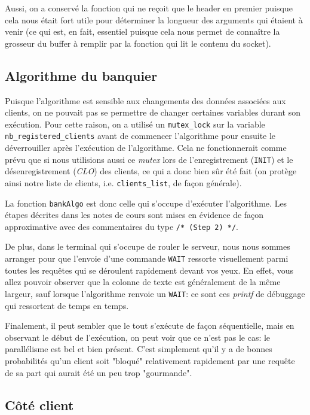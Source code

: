 \documentclass[11pt]{article}
\begin{document}
Aussi, on a conservé la fonction qui ne reçoit que le header en premier puisque cela nous était fort utile pour déterminer la longueur
des arguments qui étaient à venir (ce qui est, en fait, essentiel puisque cela nous permet de connaître la grosseur du buffer à remplir par la fonction qui lit le contenu du socket).


\subsection{Algorithme du banquier}

Puisque l'algorithme est sensible aux changements des données associées aux clients, on ne pouvait pas se permettre de changer certaines variables durant son exécution. Pour cette raison, on a utilisé un \texttt{mutex\_lock} sur la variable \texttt{nb\_registered\_clients} avant de commencer l'algorithme pour ensuite le déverrouiller après l'exécution de l'algorithme. Cela ne fonctionnerait comme prévu que si nous utilisions aussi ce \textit{mutex} lors de l'enregistrement (\texttt{INIT}) et le désenregistrement (\textit{CLO}) des clients, ce qui a donc bien sûr été fait (on protège ainsi notre liste de clients, i.e. \texttt{clients\_list}, de façon générale).

La fonction \texttt{bankAlgo} est donc celle qui s'occupe d'exécuter l'algorithme. Les étapes décrites dans les notes de cours sont mises en évidence de façon approximative avec des commentaires du type \texttt{/* (Step 2) */}.

De plus, dans le terminal qui s'occupe de rouler le serveur, nous nous sommes arranger pour que l'envoie d'une commande \texttt{WAIT} ressorte visuellement parmi toutes les requêtes qui se déroulent rapidement devant vos yeux. En effet, vous allez pouvoir observer que la colonne de texte est généralement de la même largeur, sauf lorsque l'algorithme renvoie un \texttt{WAIT}: ce sont ces \textit{printf} de débuggage qui ressortent de temps en temps.

Finalement, il peut sembler que le tout s'exécute de façon séquentielle, mais en observant le début de l'exécution, on peut voir que ce n'est pas le cas: le parallélisme est bel et bien présent. C'est simplement qu'il y a de bonnes probabilités qu'un client soit "bloqué" relativement rapidement par une requête de sa part qui aurait été un peu trop "gourmande".


\subsection{Côté client}
\end{document}
